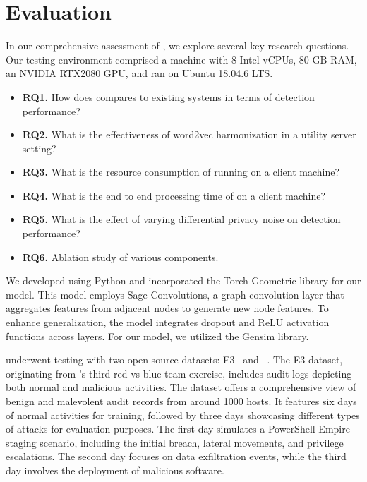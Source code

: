  \section{Evaluation}
 \label{sec:eval}

 In our comprehensive assessment of \Sys, we explore several key research questions. Our testing environment comprised a machine with 8 Intel vCPUs, 80 GB RAM, an NVIDIA RTX2080 GPU, and ran on Ubuntu 18.04.6 LTS.

\begin{itemize}[leftmargin=*]
\item \textbf{RQ1.} How does \Sys compares to existing systems in terms of detection performance?
\item \textbf{RQ2.} What is the effectiveness of word2vec harmonization in a utility server setting?
\item \textbf{RQ3.} What is the resource consumption of \Sys running on a client machine?
\item \textbf{RQ4.} What is the end to end processing time of \Sys on a client machine?
\item \textbf{RQ5.} What is the effect of varying differential privacy noise on detection performance?
\item \textbf{RQ6.} Ablation study of various \Sys components.


\end{itemize}

 We developed \Sys using Python and incorporated the Torch Geometric library for our \gnnshort model. This model employs Sage Convolutions, a graph convolution layer that aggregates features from adjacent nodes to generate new node features. To enhance generalization, the model integrates dropout and ReLU activation functions across layers. For our \wordvec model, we utilized the Gensim library.

 \Sys underwent testing with two open-source datasets: \darpa E3~\cite{darpae3} and \darpa \optc~\cite{darpatc}. The E3 dataset, originating from \darpa's third red-vs-blue team exercise, includes audit logs depicting both normal and malicious activities. The \darpa \optc dataset offers a comprehensive view of benign and malevolent audit records from around 1000 hosts. It features six days of normal activities for training, followed by three days showcasing different types of attacks for evaluation purposes. The first day simulates a PowerShell Empire staging scenario, including the initial breach, lateral movements, and privilege escalations. The second day focuses on data exfiltration events, while the third day involves the deployment of malicious software.

